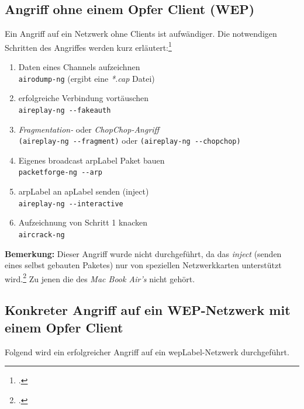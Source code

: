 \subsection{Angriff ohne einem Opfer Client (WEP)}
Ein Angriff auf ein Netzwerk ohne Clients ist aufwändiger.
Die notwendigen Schritten des Angriffes werden kurz erläutert:\footcite[][129ff.]{WrightCache201503}
\begin{enumerate}
	\item Daten eines Channels aufzeichnen\\
	\texttt{airodump-ng} (ergibt eine \textit{*.cap} Datei)

	\item erfolgreiche Verbindung vortäuschen\\
	\texttt{aireplay-ng  -{}-fakeauth}

	\item \textit{Fragmentation-} oder \textit{ChopChop-Angriff}\\
	\texttt{(aireplay-ng -{}-fragment)} oder \texttt{(aireplay-ng -{}-chopchop)}

	\item Eigenes broadcast \gls{arpLabel} Paket bauen\\
	\texttt{packetforge-ng -{}-arp}

	\item \gls{arpLabel} an \gls{apLabel} senden (inject)\\
	\texttt{aireplay-ng -{}-interactive}

	\item Aufzeichnung von Schritt 1 knacken\\
	\texttt{aircrack-ng}

\end{enumerate}

\begin{framed}
	\textbf{Bemerkung:} Dieser Angriff wurde nicht durchgeführt, da das \textit{inject} (senden eines selbst gebauten Paketes) nur von speziellen Netzwerkkarten unterstützt wird.\footcite[][89ff.]{WrightCache201503}
	Zu jenen die des \textit{Mac Book Air's} nicht gehört.
\end{framed}


\subsection{Konkreter Angriff auf ein WEP-Netzwerk mit einem Opfer Client}
\label{sec:wepAttack}
Folgend wird ein erfolgreicher Angriff auf ein \gls{wepLabel}-Netzwerk durchgeführt.

